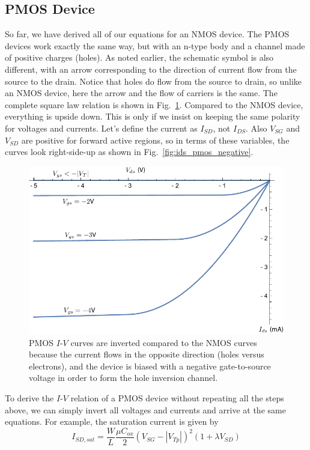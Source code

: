 \subsection{PMOS Device}
So far, we have derived all of our equations for an NMOS device.  The  PMOS devices work exactly the same way, but with an n-type body and a channel made of positive charges (holes).  As noted earlier, the schematic symbol is also different, with an arrow corresponding to the direction of current flow from the source to the drain.  Notice that holes do flow from the source to drain, so unlike an NMOS device, here the arrow and the flow of carriers is the same.  The complete square law relation is shown in Fig.~\ref{fig:idspmos}.  Compared to the NMOS device, everything is upside down. This is only if we insist on keeping the same polarity for voltages and currents.  Let's define the current as $I_{SD}$, not $I_{DS}$.   Also $V_{SG}$ and $V_{SD}$ are positive for forward active regions, so in terms of these variables, the curves look right-side-up as shown in Fig.~\ref{fig:ids_pmos_negative}.
\begin{figure}[tb]
\centering
\includegraphics[width=.75\columnwidth]{idspmos}
\caption{PMOS $I$-$V$ curves are inverted compared to the NMOS curves because the current flows in the opposite direction (holes versus electrons), and the device is biased with a negative gate-to-source voltage in order to form the hole inversion channel.}
\label{fig:idspmos}
\end{figure}
To derive the $I$-$V$ relation of a PMOS device without repeating all the steps above, we can simply invert all voltages and currents and arrive at the same equations.  For example, the saturation current is given by
    \begin{equation}
        {I_{SD,sat}} = \frac{W}{L}\frac{{\mu {C_{ox}}}}{2}{({V_{SG}} - {|V_{Tp}|})^2}(1 + \lambda {V_{SD}})
    \end{equation}
